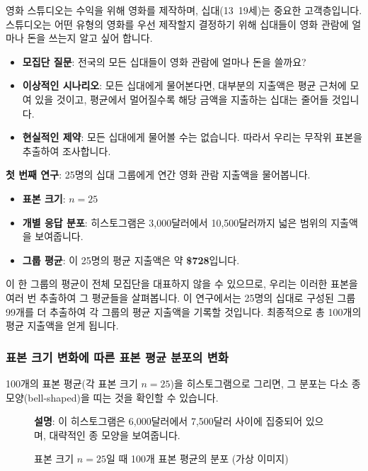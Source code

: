 \documentclass[11pt,a4paper]{book}
\theoremstyle{definition}
\begin{document}
\begin{examplebox}[title={예시: 십대들의 영화 관람 지출}]
영화 스튜디오는 수익을 위해 영화를 제작하며, 십대(13~19세)는 중요한 고객층입니다. 스튜디오는 어떤 유형의 영화를 우선 제작할지 결정하기 위해 십대들이 영화 관람에 얼마나 돈을 쓰는지 알고 싶어 합니다.

\begin{itemize}
    \item \textbf{모집단 질문}: 전국의 모든 십대들이 영화 관람에 얼마나 돈을 쓸까요?
    \item \textbf{이상적인 시나리오}: 모든 십대에게 물어본다면, 대부분의 지출액은 평균 근처에 모여 있을 것이고, 평균에서 멀어질수록 해당 금액을 지출하는 십대는 줄어들 것입니다.
    \item \textbf{현실적인 제약}: 모든 십대에게 물어볼 수는 없습니다. 따라서 우리는 무작위 표본을 추출하여 조사합니다.
\end{itemize}

\textbf{첫 번째 연구}: 25명의 십대 그룹에게 연간 영화 관람 지출액을 물어봅니다.
\begin{itemize}
    \item \textbf{표본 크기}: $n = 25$
    \item \textbf{개별 응답 분포}: 히스토그램은 3,000달러에서 10,500달러까지 넓은 범위의 지출액을 보여줍니다.
    \item \textbf{그룹 평균}: 이 25명의 평균 지출액은 약 \textbf{\$728}입니다.
\end{itemize}
이 한 그룹의 평균이 전체 모집단을 대표하지 않을 수 있으므로, 우리는 이러한 표본을 여러 번 추출하여 그 평균들을 살펴봅니다. 이 연구에서는 25명의 십대로 구성된 그룹 99개를 더 추출하여 각 그룹의 평균 지출액을 기록할 것입니다. 최종적으로 총 100개의 평균 지출액을 얻게 됩니다.
\end{examplebox}

\subsubsection*{표본 크기 변화에 따른 표본 평균 분포의 변화}

100개의 표본 평균(각 표본 크기 $n=25$)을 히스토그램으로 그리면, 그 분포는 다소 종 모양(bell-shaped)을 띠는 것을 확인할 수 있습니다.

\begin{figure}[h!]
    \centering
    \caption{표본 크기 $n=25$일 때 100개 표본 평균의 분포 (가상 이미지)}
    \label{fig:hist_n25}
    \textbf{설명}: 이 히스토그램은 6,000달러에서 7,500달러 사이에 집중되어 있으며, 대략적인 종 모양을 보여줍니다.
\end{figure}
\end{document}
